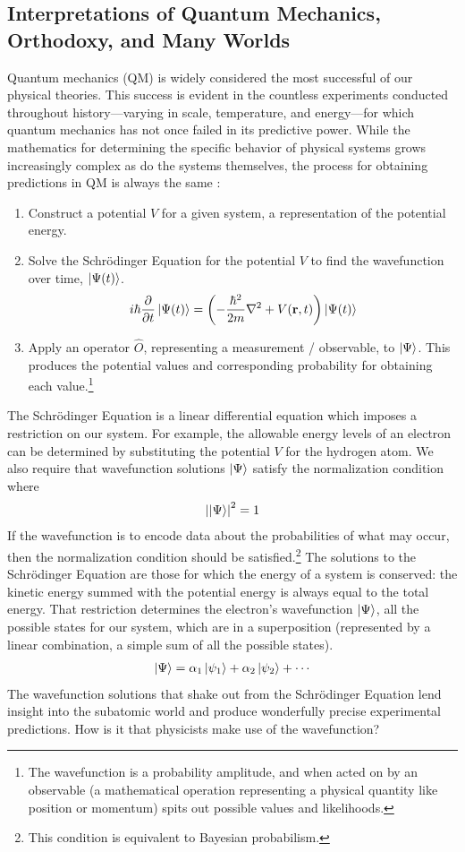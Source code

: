 \documentclass{article}
\begin{document}
\subsection{Interpretations of Quantum Mechanics, Orthodoxy, and Many Worlds}
Quantum mechanics (QM) is widely considered the most successful of our physical theories.
This success is evident in the countless experiments conducted throughout history—varying in scale, temperature, and energy—for which quantum mechanics has not once failed in its predictive power.
While the mathematics for determining the specific behavior of physical systems grows increasingly complex as do the systems themselves, the process for obtaining predictions in QM is always the same \parencite[3]{griffithsIntroductionQuantumMechanics2018}:
\begin{enumerate}
		\item Construct a potential $V$ for a given system, a representation of the potential energy.
		\item Solve the Schrödinger Equation for the potential $V$ to find the wavefunction over time, $\ket{\Psi(t)}$.
		\begin{gather}
			i\hbar \frac{\partial}{\partial t} \ket{\Psi(t)} =
			\left( -\frac{\hbar^2}{2m} \nabla^2 + V(\mathbf{r},t) \right) \ket{\Psi(t)}
		\end{gather}
		\item Apply an operator $\hat{O}$, representing a measurement / observable, to $\ket{\Psi}$. This produces the potential values and corresponding probability for obtaining each value.\footnote{The wavefunction is a probability amplitude, and when acted on by an observable (a mathematical operation representing a physical quantity like position or momentum) spits out possible values and likelihoods.}
\end{enumerate}
The Schrödinger Equation is a linear differential equation which imposes a restriction on our system. For example, the allowable energy levels of an electron can be determined by substituting the potential $V$ for the hydrogen atom.
We also require that wavefunction solutions $\ket{\Psi}$ satisfy the normalization condition where 
\begin{gather}
	\left|\ket{\Psi}\right|^2 = 1
\end{gather}
If the wavefunction is to encode data about the probabilities of what may occur, then the normalization condition should be satisfied.\footnote{This condition is equivalent to Bayesian probabilism.}
The solutions to the Schrödinger Equation are those for which the energy of a system is conserved: the kinetic energy summed with the potential energy is always equal to the total energy.
That restriction determines the electron's wavefunction $\ket{\Psi}$, all the possible states for our system, which are in a superposition (represented by a linear combination, a simple sum of all the possible states).
\begin{gather}
	\ket{\Psi} = \alpha_1 \ket{\psi_1} + \alpha_2 \ket{\psi_2} + \cdots
\end{gather}
The wavefunction solutions that shake out from the Schrödinger Equation lend insight into the subatomic world and produce wonderfully precise experimental predictions.
How is it that physicists make use of the wavefunction?
\end{document}
